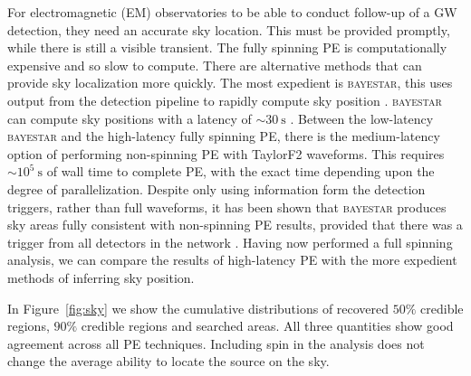 For electromagnetic (EM) observatories to be able to conduct follow-up of a GW detection, they need an accurate sky location. This must be provided promptly, while there is still a visible transient. The fully spinning PE is computationally expensive and so slow to compute. There are alternative methods that can provide sky localization more quickly. The most expedient is \textsc{bayestar}, this uses output from the detection pipeline to rapidly compute sky position \citep{Singer_2014}. \textsc{bayestar} can compute sky positions with a latency of $\sim30~\mathrm{s}$ \citep{Berry_2014}. Between the low-latency \textsc{bayestar} and the high-latency fully spinning PE, there is the medium-latency option of performing non-spinning PE with TaylorF2 waveforms. This requires $\sim10^5~\mathrm{s}$ of wall time to complete PE, with the exact time depending upon the degree of parallelization. Despite only using information form the detection triggers, rather than full waveforms, it has been shown that \textsc{bayestar} produces sky areas fully consistent with non-spinning PE results, provided that there was a trigger from all detectors in the network \citep{Singer_2014,Berry_2014}. Having now performed a full spinning analysis, we can compare the results of high-latency PE with the more expedient methods of inferring sky position.

In Figure~\ref{fig:sky} we show the cumulative distributions of recovered $50\%$ credible regions, $90\%$ credible regions and searched areas. All three quantities show good agreement across all PE techniques. %
Including spin in the analysis does not change the average ability to locate the source on the sky.
